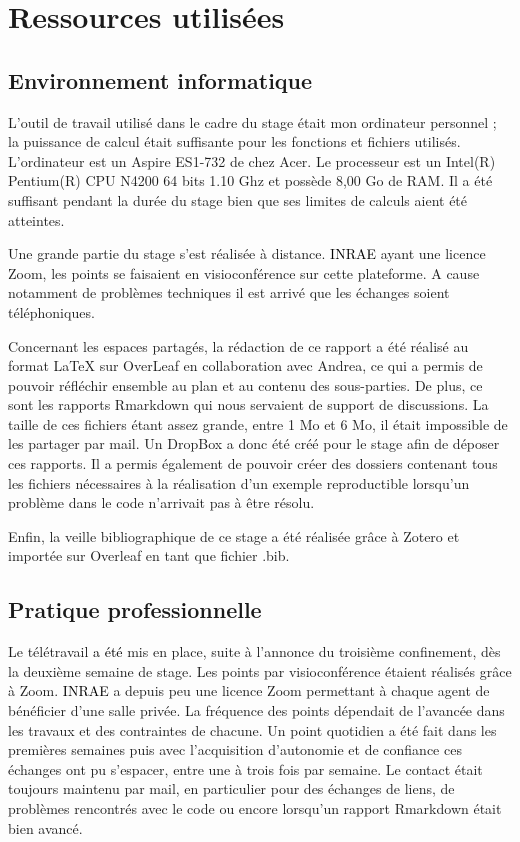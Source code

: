 \documentclass[twoside]{article}
\newcommand{\AR}[1]{\textcolor{black}{#1}}
\begin{document}
\section{\textbf{Ressources utilis\'ees}}
    \subsection{Environnement informatique}

\vspace{0.5cm}L'outil de travail utilisé dans le cadre du stage était mon ordinateur personnel ; la puissance de calcul était suffisante pour les fonctions et fichiers utilisés. L'ordinateur est un Aspire ES1-732 de chez Acer. Le processeur est un Intel(R) Pentium(R) CPU N4200 64 bits 1.10 Ghz et possède 8,00 Go de RAM. Il a été suffisant pendant la durée du stage bien que ses limites de calculs aient été atteintes. 

\vspace{0.5cm}Une grande partie du stage s'est réalisée à distance. \AR{INRAE} ayant une licence Zoom, les points se faisaient en visioconférence sur cette plateforme. A cause notamment de problèmes techniques il est arrivé que les échanges soient téléphoniques.

\vspace{0.5cm}Concernant les espaces partagés, la rédaction de ce rapport a été réalisé au format {\LaTeX} sur OverLeaf en collaboration avec Andrea, ce qui a permis de pouvoir réfléchir ensemble au plan et au contenu des sous-parties. De plus, ce sont les rapports Rmarkdown qui nous servaient de support de discussions. La taille de ces fichiers étant assez grande, entre 1 Mo et 6 Mo, il était impossible de les partager par mail. Un DropBox a donc été créé pour le stage afin de déposer ces rapports. Il a permis également de pouvoir créer des dossiers contenant tous les fichiers nécessaires à la réalisation d'un exemple reproductible lorsqu'un problème dans le code n'arrivait pas à être résolu.

\vspace{0.5cm}Enfin, la veille bibliographique de ce stage a été réalisée grâce à Zotero et importée sur Overleaf en tant que fichier .bib.


    \subsection{Pratique professionnelle}

    \vspace{0.5cm}Le télétravail \AR{a été} mis en place, suite à l'annonce du troisième confinement, dès la deuxième semaine de stage. Les points par visioconférence étaient réalisés grâce à Zoom. \AR{INRAE} a depuis peu une licence Zoom permettant à chaque agent de bénéficier d'une salle privée. La fréquence des points dépendait de l'avancée dans les travaux et des contraintes de chacune. Un point quotidien a été fait dans les premières semaines puis avec l'acquisition d'autonomie et de confiance ces échanges ont pu s'espacer, entre une à trois fois par semaine. Le contact était toujours maintenu par mail, en particulier pour des échanges de liens, de problèmes rencontrés avec le code ou encore lorsqu'un rapport Rmarkdown était bien avancé.
\end{document}
